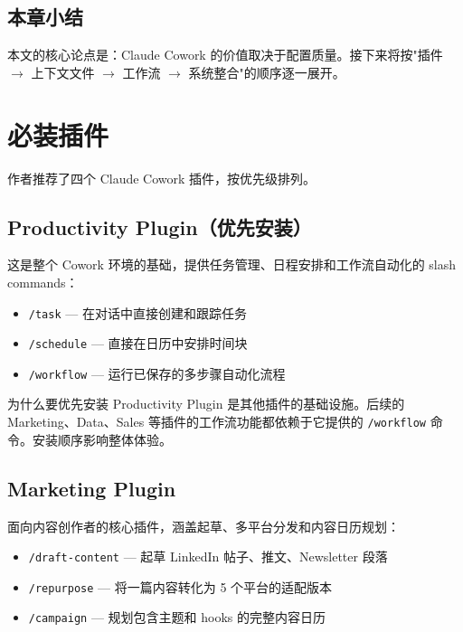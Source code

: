 \documentclass[a4paper]{article}
\begin{document}
\subsection{本章小结}

本文的核心论点是：Claude Cowork 的价值取决于配置质量。接下来将按"插件 $\to$ 上下文文件 $\to$ 工作流 $\to$ 系统整合"的顺序逐一展开。

\section{必装插件}

作者推荐了四个 Claude Cowork 插件，按优先级排列。

\subsection{Productivity Plugin（优先安装）}

这是整个 Cowork 环境的基础，提供任务管理、日程安排和工作流自动化的 slash commands：

\begin{itemize}
    \item \texttt{/task} --- 在对话中直接创建和跟踪任务
    \item \texttt{/schedule} --- 直接在日历中安排时间块
    \item \texttt{/workflow} --- 运行已保存的多步骤自动化流程
\end{itemize}

\begin{knowledgebox}{为什么要优先安装}
Productivity Plugin 是其他插件的基础设施。后续的 Marketing、Data、Sales 等插件的工作流功能都依赖于它提供的 \texttt{/workflow} 命令。安装顺序影响整体体验。
\end{knowledgebox}

\subsection{Marketing Plugin}

面向内容创作者的核心插件，涵盖起草、多平台分发和内容日历规划：

\begin{itemize}
    \item \texttt{/draft-content} --- 起草 LinkedIn 帖子、推文、Newsletter 段落
    \item \texttt{/repurpose} --- 将一篇内容转化为 5 个平台的适配版本
    \item \texttt{/campaign} --- 规划包含主题和 hooks 的完整内容日历
\end{itemize}
\end{document}
